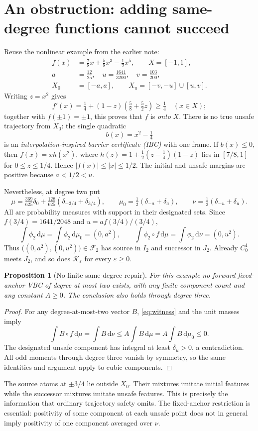 \documentclass[10pt,letterpaper]{article}
\newtheorem{proposition}{Proposition}
\theoremstyle{remark}
\newcommand{\dd}{\,\mathrm d}
\begin{document}
\section{An obstruction: adding same-degree functions cannot succeed}
Reuse the nonlinear example from the earlier note:
\begin{align*}
 f(x)&=\tfrac78x+\tfrac58x^3-\tfrac12x^5,\qquad X=[-1,1],\\
 a&=\tfrac{12}{25},\quad u=\tfrac{1641}{3200},\quad v=\tfrac{103}{200},\\
 X_0&=[-a,a],\qquad X_u=[-v,-u]\cup[u,v].
\end{align*}
Writing $z=x^2$ gives
\[
 f'(x)=\tfrac14+(1-z)(\tfrac58+\tfrac52z)\geq\tfrac14\quad(x\in X);
\]
together with $f(\pm1)=\pm1$, this proves that $f$ is \emph{onto} $X$.
There is no true unsafe trajectory from $X_0$: the single quadratic
\[
 b(x)=x^2-\tfrac14
\]
is an \emph{interpolation-inspired barrier certificate (IBC)} with one frame. If $b(x)\leq0$, then $f(x)=xh(x^2)$, where
$h(z)=1+\tfrac12(z-\tfrac14)(1-z)$ lies in $[7/8,1]$ for $0\leq z\leq1/4$. Hence $|f(x)|\leq|x|\leq1/2$. The initial and unsafe margins are positive because $a<1/2<u$.

Nevertheless, at degree two put
\[
 \mu=\tfrac{369}{625}\delta_0+
     \tfrac{128}{625}(\delta_{-3/4}+\delta_{3/4}),\qquad
 \mu_0=\tfrac12(\delta_{-a}+\delta_a),\qquad
 \nu=\tfrac12(\delta_{-u}+\delta_u).
\]
All are probability measures with support in their designated sets. Since
$f(3/4)=1641/2048$ and $u=a f(3/4)/(3/4)$,
\begin{equation}\label{eq:witness}
 \int\phi_2\dd\mu=\int\phi_2\dd\mu_0=(0,a^2),\qquad
 \int\phi_2\circ f\dd\mu=\int\phi_2\dd\nu=(0,u^2).
\end{equation}
Thus $\bigl((0,a^2),(0,u^2)\bigr)\in\mathcal F_2$ has source in $I_2$ and successor in $J_2$. Already $C_0^1$ meets $J_2$, and so does $\mathcal K_\varepsilon$ for every $\varepsilon\geq0$.

\begin{proposition}[No finite same-degree repair]\label{prop:obstruction}
For this example no forward fixed-anchor VBC of degree at most two exists, with any finite component count and any constant $A\geq0$. The conclusion also holds through degree three.
\end{proposition}
\begin{proof}
For any degree-at-most-two vector $B$, \eqref{eq:witness} and the unit masses imply
\[
 \int B\circ f\dd\mu=\int B\dd\nu
 \leq A\int B\dd\mu
 =A\int B\dd\mu_0\leq0.
\]
The designated unsafe component has integral at least $\delta_u>0$, a contradiction. All odd moments through degree three vanish by symmetry, so the same identities and argument apply to cubic components.
\end{proof}
The source atoms at $\pm3/4$ lie outside $X_0$. Their mixtures imitate initial features while the successor mixtures imitate unsafe features. This is precisely the information that ordinary trajectory safety omits. The fixed-anchor restriction is essential: positivity of some component at each unsafe point does not in general imply positivity of one component averaged over $\nu$.
\end{document}

